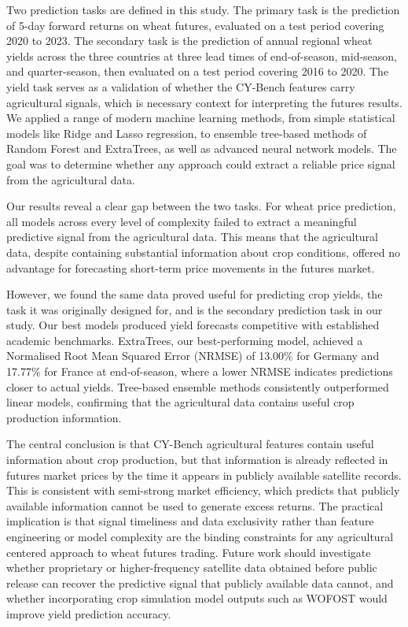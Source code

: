 \documentclass[pdflatex,sn-mathphys-num, oneside]{sn-jnl}%
\theoremstyle{thmstyleone}%
\theoremstyle{thmstyletwo}%
\theoremstyle{thmstylethree}%
\begin{document}
Two prediction tasks are defined in this study. The primary task is the prediction of 5-day forward returns on wheat futures, evaluated on a test period covering 2020 to 2023. The secondary task is the prediction of annual regional wheat yields across the three countries at three lead times of end-of-season, mid-season, and quarter-season, then evaluated on a test period covering 2016 to 2020. The yield task serves as a validation of whether the CY-Bench features carry agricultural signals, which is necessary context for interpreting the futures results. We applied a range of modern machine learning methods, from simple statistical models like Ridge and Lasso regression, to ensemble tree-based methods of Random Forest and ExtraTrees, as well as advanced neural network models. The goal was to determine whether any approach could extract a reliable price signal from the agricultural data.

Our results reveal a clear gap between the two tasks. For wheat price prediction, all models across every level of complexity failed to extract a meaningful predictive signal from the agricultural data. This means that the agricultural data, despite containing substantial information about crop conditions, offered no advantage for forecasting short-term price movements in the futures market.

However, we found the same data proved useful for predicting crop yields, the task it was originally designed for, and is the secondary prediction task in our study. Our best models produced yield forecasts competitive with established academic benchmarks. ExtraTrees, our best-performing model, achieved a Normalised Root Mean Squared Error (NRMSE) of 13.00\% for Germany and 17.77\% for France at end-of-season, where a lower NRMSE indicates predictions closer to actual yields. Tree-based ensemble methods consistently outperformed linear models, confirming that the agricultural data contains useful crop production information.

The central conclusion is that CY-Bench agricultural features contain useful information about crop production, but that information is already reflected in futures market prices by the time it appears in publicly available satellite records. This is consistent with semi-strong market efficiency, which predicts that publicly available information cannot be used to generate excess returns. The practical implication is that signal timeliness and data exclusivity rather than feature engineering or model complexity are the binding constraints for any agricultural centered approach to wheat futures trading. Future work should investigate whether proprietary or higher-frequency satellite data obtained before public release can recover the predictive signal that publicly available data cannot, and whether incorporating crop simulation model outputs such as WOFOST would improve yield prediction accuracy.
\end{document}
